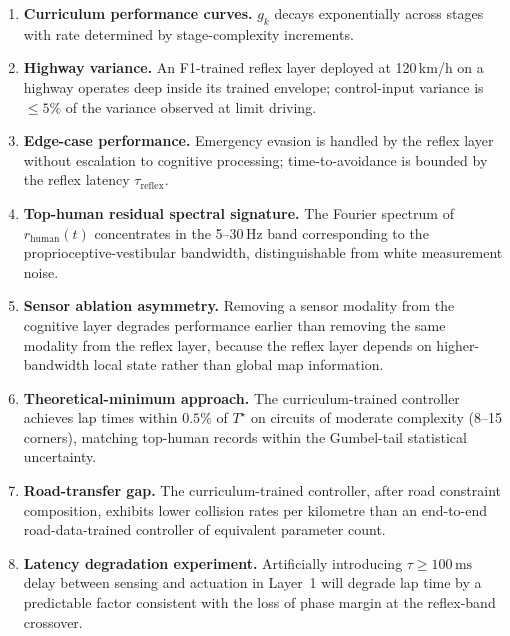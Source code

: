 \documentclass[11pt,twocolumn]{article}
\theoremstyle{definition}
\theoremstyle{remark}
\begin{document}
\begin{enumerate}[leftmargin=*,itemsep=2pt]
\item \textbf{Curriculum performance curves.} $g_k$ decays exponentially across stages with rate determined by stage-complexity increments.

\item \textbf{Highway variance.} An F1-trained reflex layer deployed at 120\,km/h on a highway operates deep inside its trained envelope; control-input variance is $\le 5\%$ of the variance observed at limit driving.

\item \textbf{Edge-case performance.} Emergency evasion is handled by the reflex layer without escalation to cognitive processing; time-to-avoidance is bounded by the reflex latency $\tau_{\mathrm{reflex}}$.

\item \textbf{Top-human residual spectral signature.} The Fourier spectrum of $r_{\mathrm{human}}(t)$ concentrates in the 5--30\,Hz band corresponding to the proprioceptive-vestibular bandwidth, distinguishable from white measurement noise.

\item \textbf{Sensor ablation asymmetry.} Removing a sensor modality from the cognitive layer degrades performance earlier than removing the same modality from the reflex layer, because the reflex layer depends on higher-bandwidth local state rather than global map information.

\item \textbf{Theoretical-minimum approach.} The curriculum-trained controller achieves lap times within $0.5\%$ of $T^{\star}$ on circuits of moderate complexity (8--15 corners), matching top-human records within the Gumbel-tail statistical uncertainty.

\item \textbf{Road-transfer gap.} The curriculum-trained controller, after road constraint composition, exhibits lower collision rates per kilometre than an end-to-end road-data-trained controller of equivalent parameter count.

\item \textbf{Latency degradation experiment.} Artificially introducing $\tau \ge 100\,\mathrm{ms}$ delay between sensing and actuation in Layer~1 will degrade lap time by a predictable factor consistent with the loss of phase margin at the reflex-band crossover.
\end{enumerate}
\end{document}
